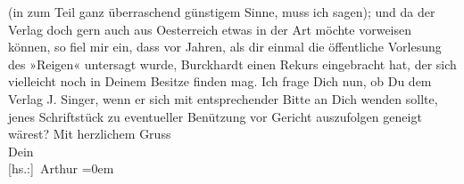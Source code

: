 \begin{ledgroupsized}[t]{13cm}
               (in zum Teil ganz überraschend günstigem Sinne, muss ich sagen); und da der Verlag
               doch gern auch aus Oesterreich etwas in der Art
               möchte vorweisen können, so fiel mir ein, dass vor Jahren, als dir einmal die
               öffentliche Vorlesung des »Reigen« untersagt
               wurde, Burckhardt einen Rekurs eingebracht
               hat, der sich vielleicht noch in Deinem Besitze finden mag. Ich frage Dich nun, ob Du
               dem Verlag J. Singer, wenn er sich {\pb}mit entsprechender
               Bitte an Dich wenden sollte, jenes Schriftstück zu eventueller Benützung vor Gericht
               auszufolgen geneigt wärest? \pend
           \pstart
           Mit herzlichem Gruss{\\[\baselineskip]}Dein{\\[\baselineskip]}\spacefill\mbox{{[}hs.:{]} Arthur}\pend
           \leftskip=0em{}
         
         \endnumbering{}\end{ledgroupsized}  \newcommand{\dateiname}{L02181}\newcommand{\titel}{Arthur Schnitzler an Hermann Bahr, 12. 6. 1914}\newcommand{\editorInnen}{ Kurt Ifkovits,  Martin Anton Müller}
      